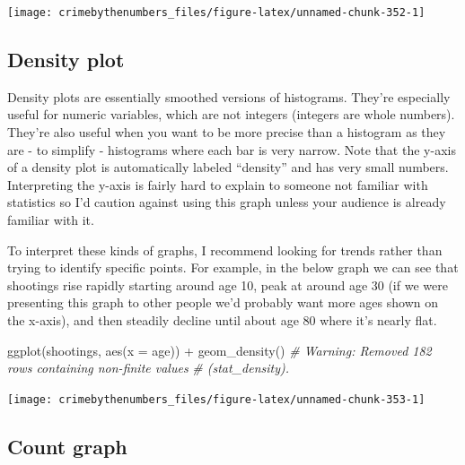 \documentclass[
]{krantz}
\makeatletter
\newenvironment{Shaded}{\begin{snugshade}}{\end{snugshade}}
\newcommand{\AttributeTok}[1]{\textcolor[rgb]{0.61,0.61,0.61}{#1}}
\newcommand{\CommentTok}[1]{\textcolor[rgb]{0.37,0.37,0.37}{\textit{#1}}}
\newcommand{\FunctionTok}[1]{\textcolor[rgb]{0,0,0}{#1}}
\newcommand{\NormalTok}[1]{#1}
\newcommand{\SpecialCharTok}[1]{\textcolor[rgb]{0,0,0}{#1}}
\newenvironment{kframe}{%
\medskip{}
\setlength{\fboxsep}{.8em}
 \def\at@end@of@kframe{}%
 \ifinner\ifhmode%
  \def\at@end@of@kframe{\end{minipage}}%
  \begin{minipage}{\columnwidth}%
 \fi\fi%
 \def\FrameCommand##1{\hskip\@totalleftmargin \hskip-\fboxsep
 \colorbox{shadecolor}{##1}\hskip-\fboxsep
     \hskip-\linewidth \hskip-\@totalleftmargin \hskip\columnwidth}%
 \MakeFramed {\advance\hsize-\width
   \@totalleftmargin\z@ \linewidth\hsize
   \@setminipage}}%
 {\par\unskip\endMakeFramed%
 \at@end@of@kframe}
\renewenvironment{Shaded}{\begin{kframe}}{\end{kframe}}
\makeatother
\begin{document}
\begin{center}\texttt{[image: crimebythenumbers\_files/figure-latex/unnamed-chunk-352-1]} \end{center}

\hypertarget{density-plot}{%
\subsection{Density plot}\label{density-plot}}

Density plots are essentially smoothed versions of
histograms. They're especially useful for numeric variables,
which are not integers (integers are whole numbers). They're
also useful when you want to be more precise than a
histogram as they are - to simplify - histograms where each
bar is very narrow. Note that the y-axis of a density plot
is automatically labeled ``density'' and has very small
numbers. Interpreting the y-axis is fairly hard to explain
to someone not familiar with statistics so I'd caution
against using this graph unless your audience is already
familiar with it.

To interpret these kinds of graphs, I recommend looking for
trends rather than trying to identify specific points. For
example, in the below graph we can see that shootings rise
rapidly starting around age 10, peak at around age 30 (if we
were presenting this graph to other people we'd probably
want more ages shown on the x-axis), and then steadily
decline until about age 80 where it's nearly flat.

\begin{Shaded}
\begin{Highlighting}[]
\FunctionTok{ggplot}\NormalTok{(shootings, }\FunctionTok{aes}\NormalTok{(}\AttributeTok{x =}\NormalTok{ age)) }\SpecialCharTok{+}
  \FunctionTok{geom\_density}\NormalTok{()}
\CommentTok{\# Warning: Removed 182 rows containing non{-}finite values}
\CommentTok{\# (stat\_density).}
\end{Highlighting}
\end{Shaded}

\begin{center}\texttt{[image: crimebythenumbers\_files/figure-latex/unnamed-chunk-353-1]} \end{center}

\hypertarget{count-graph}{%
\subsection{Count graph}\label{count-graph}}
\end{document}
